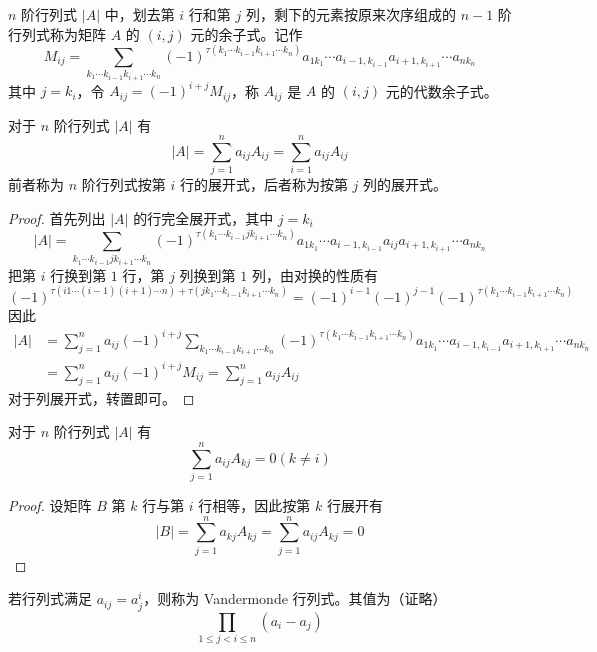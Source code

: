 \begin{definition}[代数余子式]
	$n$ 阶行列式 $|A|$ 中，划去第 $i$ 行和第 $j$ 列，剩下的元素按原来次序组成的 $n-1$ 阶行列式称为矩阵 $A$ 的 $(i,j)$ 元的余子式。记作
	\[M_{ij} = \sum_{k_1\cdots k_{i-1}k_{i+1}\cdots k_n}(-1)^{\tau(k_1\cdots k_{i-1}k_{i+1}\cdots k_n)}a_{1k_1}\cdots a_{i-1,k_{i-1}}a_{i+1,k_{i+1}}\cdots a_{nk_n}\]
	其中 $j=k_i$，令 $A_{ij}=(-1)^{i+j}M_{ij}$，称 $A_{ij}$ 是 $A$ 的 $(i,j)$ 元的代数余子式。
\end{definition}

\begin{theorem}
	对于 $n$ 阶行列式 $|A|$ 有
	\[|A| = \sum_{j=1}^na_{ij}A_{ij} = \sum_{i=1}^na_{ij}A_{ij}\]
	前者称为 $n$ 阶行列式按第 $i$ 行的展开式，后者称为按第 $j$ 列的展开式。
\end{theorem}

\begin{proof}
	首先列出 $|A|$ 的行完全展开式，其中 $j=k_i$
	\[|A|=\sum_{k_1\cdots k_{i-1}jk_{i+1}\cdots k_n}(-1)^{\tau(k_1\cdots k_{i-1}jk_{i+1}\cdots k_n)}a_{1k_1}\cdots a_{i-1,k_{i-1}}a_{ij}a_{i+1,k_{i+1}}\cdots a_{nk_n}\]
	把第 $i$ 行换到第 $1$ 行，第 $j$ 列换到第 $1$ 列，由对换的性质有
	\[(-1)^{\tau(i1\cdots (i-1)(i+1)\cdots n)+\tau(jk_1\cdots k_{i-1}k_{i+1}\cdots k_n)}=(-1)^{i-1}(-1)^{j-1}(-1)^{\tau(k_1\cdots k_{i-1}k_{i+1}\cdots k_n)}\]
	因此
	\begin{equation*}
		\begin{aligned}
			|A| & =\sum_{j=1}^na_{ij}(-1)^{i+j}\sum_{k_1\cdots k_{i-1}k_{i+1}\cdots k_n}(-1)^{\tau(k_1\cdots k_{i-1}k_{i+1}\cdots k_n)}a_{1k_1}\cdots a_{i-1,k_{i-1}}a_{i+1,k_{i+1}}\cdots a_{nk_n} \\
			    & =\sum_{j=1}^na_{ij}(-1)^{i+j}M_{ij}=\sum_{j=1}^na_{ij}A_{ij}
		\end{aligned}
	\end{equation*}
	对于列展开式，转置即可。
\end{proof}

\begin{theorem}
	对于 $n$ 阶行列式 $|A|$ 有
	\[\sum_{j=1}^na_{ij}A_{kj} = 0(k\ne i)\]
\end{theorem}

\begin{proof}
	设矩阵 $B$ 第 $k$ 行与第 $i$ 行相等，因此按第 $k$ 行展开有
	\[|B|=\sum_{j=1}^na_{kj}A_{kj}=\sum_{j=1}^na_{ij}A_{kj}=0\]
\end{proof}

\begin{definition}
	若行列式满足 $a_{ij} = a_j^i$，则称为 Vandermonde 行列式。其值为（证略）
	\[\prod_{1 \leqslant j < i \leqslant n}(a_i-a_j)\]
\end{definition}

